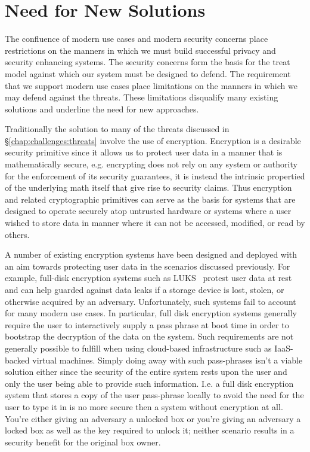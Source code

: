 \section{Need for New Solutions}
\label{chap:challenges:solutions}

The confluence of modern use cases and modern security concerns place
restrictions on the manners in which we must build successful privacy
and security enhancing systems. The security concerns form the basis
for the treat model against which our system must be designed to
defend. The requirement that we support modern use cases place
limitations on the manners in which we may defend against the
threats. These limitations disqualify many existing solutions and
underline the need for new approaches.

Traditionally the solution to many of the threats discussed in
\S\ref{chap:challenges:threats} involve the use of
encryption. Encryption is a desirable security primitive since it
allows us to protect user data in a manner that is mathematically
secure, e.g. encrypting does not rely on any system or authority for
the enforcement of its security guarantees, it is instead the
intrinsic propertied of the underlying math itself that give rise to
security claims. Thus encryption and related cryptographic primitives
can serve as the basis for systems that are designed to operate
securely atop untrusted hardware or systems where a user wished to
store data in manner where it can not be accessed, modified, or read
by others.

A number of existing encryption systems have been designed and
deployed with an aim towards protecting user data in the scenarios
discussed previously. For example, full-disk encryption systems such
as LUKS~\cite{luks} protest user data at rest and can help guarded
against data leaks if a storage device is lost, stolen, or otherwise
acquired by an adversary. Unfortunately, such systems fail to account
for many modern use cases. In particular, full disk encryption systems
generally require the user to interactively supply a pass phrase at
boot time in order to bootstrap the decryption of the data on the
system. Such requirements are not generally possible to fulfill when
using cloud-based infrastructure such as IaaS-backed virtual
machines. Simply doing away with such pass-phrases isn't a viable
solution either since the security of the entire system rests upon the
user and only the user being able to provide such information. I.e. a
full disk encryption system that stores a copy of the user pass-phrase
locally to avoid the need for the user to type it in is no more secure
then a system without encryption at all. You're either giving an
adversary a unlocked box or you're giving an adversary a locked box as
well as the key required to unlock it; neither scenario results in a
security benefit for the original box owner.

